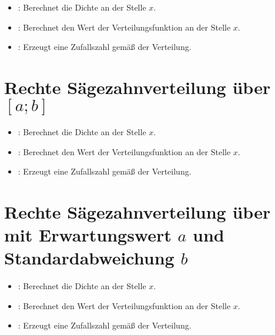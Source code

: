 \begin{itemize}

\item
{}:
Berechnet die Dichte an der Stelle $x$.

\item
{}:
Berechnet den Wert der Verteilungsfunktion an der Stelle $x$.

\item
{}:
Erzeugt eine Zufallszahl gemäß der Verteilung.

\end{itemize}



\section{Rechte Sägezahnverteilung über \texorpdfstring{$[a;b]$}{[a;b]}}

\begin{itemize}

\item
{}:
Berechnet die Dichte an der Stelle $x$.

\item
{}:
Berechnet den Wert der Verteilungsfunktion an der Stelle $x$.

\item
{}:
Erzeugt eine Zufallszahl gemäß der Verteilung.

\end{itemize}



\section{Rechte Sägezahnverteilung über mit Erwartungswert \texorpdfstring{$a$}{a} und Standardabweichung \texorpdfstring{$b$}{b}}

\begin{itemize}

\item
{}:
Berechnet die Dichte an der Stelle $x$.

\item
{}:
Berechnet den Wert der Verteilungsfunktion an der Stelle $x$.

\item
{}:
Erzeugt eine Zufallszahl gemäß der Verteilung.

\end{itemize}



